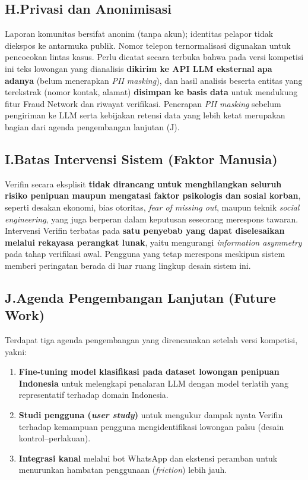 \documentclass[12pt,a4paper]{article}
\begin{document}
\subsection*{H.\quad Privasi dan Anonimisasi}
Laporan komunitas bersifat anonim (tanpa akun); identitas pelapor tidak diekspos ke antarmuka
publik. Nomor telepon ternormalisasi digunakan untuk pencocokan lintas kasus. Perlu dicatat
secara terbuka bahwa pada versi kompetisi ini teks lowongan yang dianalisis \textbf{dikirim ke
API LLM eksternal apa adanya} (belum menerapkan \textit{PII masking}), dan hasil analisis beserta
entitas yang terekstrak (nomor kontak, alamat) \textbf{disimpan ke basis data} untuk mendukung
fitur Fraud Network dan riwayat verifikasi. Penerapan \textit{PII masking} sebelum pengiriman ke
LLM serta kebijakan retensi data yang lebih ketat merupakan bagian dari agenda pengembangan
lanjutan (J).

\subsection*{I.\quad Batas Intervensi Sistem (Faktor Manusia)}
Verifin secara eksplisit \textbf{tidak dirancang untuk menghilangkan seluruh risiko penipuan
maupun mengatasi faktor psikologis dan sosial korban}, seperti desakan ekonomi, bias otoritas,
\textit{fear of missing out}, maupun teknik \textit{social engineering}, yang juga berperan
dalam keputusan seseorang merespons tawaran. Intervensi Verifin terbatas pada \textbf{satu penyebab
yang dapat diselesaikan melalui rekayasa perangkat lunak}, yaitu mengurangi
\textit{information asymmetry} pada tahap verifikasi awal. Pengguna yang tetap merespons meskipun
sistem memberi peringatan berada di luar ruang lingkup desain sistem ini.\par

\subsection*{J.\quad Agenda Pengembangan Lanjutan (Future Work)}
Terdapat tiga agenda pengembangan yang direncanakan setelah versi kompetisi, yakni:
\begin{enumerate}[label=\textbf{\arabic*.}]
\item \textbf{Fine-tuning model klasifikasi pada dataset lowongan penipuan Indonesia} untuk
melengkapi penalaran LLM dengan model terlatih yang representatif terhadap domain Indonesia.
\item \textbf{Studi pengguna (\textit{user study})} untuk mengukur dampak nyata Verifin terhadap kemampuan pengguna
mengidentifikasi lowongan palsu (desain kontrol--perlakuan).
\item \textbf{Integrasi kanal} melalui bot WhatsApp dan ekstensi peramban untuk menurunkan hambatan penggunaan
(\textit{friction}) lebih jauh.
\end{enumerate}
\end{document}

